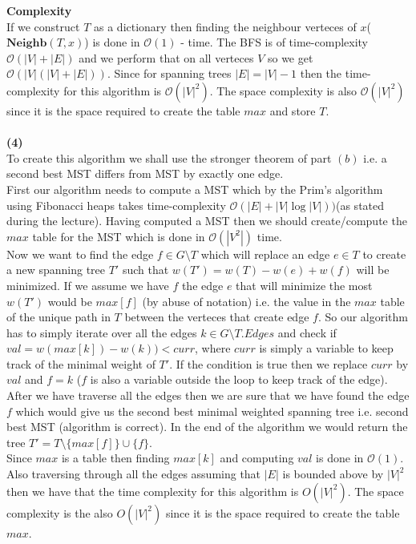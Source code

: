 \documentclass[10pt,a4paper]{article}
\begin{document}
\textbf{Complexity}\\
If we construct $T$ as a dictionary then finding the neighbour verteces of $x$( $\mathbf{Neighb}(T,x)$) is done in $\mathcal{O}(1)$ - time. The BFS is of time-complexity $\mathcal{O}(|V| + |E|)$ and we perform that on all verteces $V$ so we get $\mathcal{O}(|V|(|V|+|E|))$. Since for spanning trees $|E| = |V|-1$ then the time-complexity for this algorithm is $\mathcal {O}(|V|^2)$. 
The space complexity is also $\mathcal{O}(|V|^2)$ since it is the space required to create the table $max$ and store $T$. \\\\
\textbf{(4)}\\
To create this algorithm we shall use the stronger theorem of part $(b)$ i.e. a second best MST differs from MST by exactly one edge. \\
First our algorithm needs to compute a MST which by the Prim's algorithm using Fibonacci heaps takes time-complexity $\mathcal{O}(|E| +| V|\log| V|) )$(as stated during the lecture). Having computed a MST then we should create/compute the $max$ table for the MST which is done in $\mathcal{O}(|V^2|)$ time. \\
Now we want to find the edge $f \in G\setminus T$ which will replace an edge $e \in T$  to create a new spanning tree $T'$ such that $w(T') = w(T) - w(e) + w(f)$ will be minimized. If we assume we have $f$ the edge $e$ that will minimize the most $w(T')$ would be $max[f]$ (by abuse of notation) i.e. the value in the $max$ table of the unique path in $T$ between the verteces that create edge $f$. So our algorithm has to simply iterate over all the edges $k \in G \setminus T.Edges$ and check if $val = w(max[k]) - w(k)) < curr$, where $curr$ is simply a variable to keep track of the minimal weight of $T'$. If the condition is true then we replace $curr$ by $val $ and $f = k$ ($f$ is also a variable outside the loop to keep track of the edge). After we have traverse all the edges then we are sure that we have found the edge $f$ which would give us the second best minimal weighted spanning tree i.e. second best MST (algorithm is correct).  In the end of the algorithm we would return the tree $T' = T \setminus \{max[f]\} \cup \{f\}$. \\
Since $max$ is a table then finding $max[k]$ and computing $val$ is done in $\mathcal{O}(1)$. Also traversing through all the edges assuming that $|E|$ is bounded above by $|V|^2$ then we have that the time complexity for this algorithm is $O(|V|^2)$. The space complexity is the also $O(|V|^2)$ since it is the space required to create the table $max$.
\end{document}
